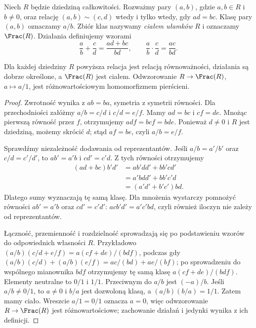 \begin{definicja}
Niech $R$ będzie dziedziną całkowitości.
Rozważmy pary $(a,b)$, gdzie $a,b\in R$ i $b\ne0$,
oraz relację $(a,b)\sim(c,d)$ wtedy i tylko wtedy,
gdy $ad=bc$. Klasę pary $(a,b)$ oznaczamy $a/b$.
Zbiór klas nazywamy \emph{ciałem ułamków} $R$
i oznaczamy $\Frac(R)$. Działania definiujemy wzorami
\[
\frac ab+\frac cd=\frac{ad+bc}{bd},\qquad
\frac ab\cdot\frac cd=\frac{ac}{bd}.
\]
\end{definicja}

\begin{lemat}
\label{lem:frac-construction}
Dla każdej dziedziny $R$ powyższa relacja jest relacją
równoważności, działania są dobrze określone, a $\Frac(R)$
jest ciałem. Odwzorowanie $R\to\Frac(R)$,
$a\mapsto a/1$, jest różnowartościowym homomorfizmem pierścieni.
\end{lemat}
\begin{proof}
Zwrotność wynika z $ab=ba$, symetria z symetrii równości.
Dla przechodniości załóżmy $a/b=c/d$ i $c/d=e/f$.
Mamy $ad=bc$ i $cf=de$. Mnożąc pierwszą równość przez
$f$, otrzymujemy $adf=bcf=bde$. Ponieważ $d\ne0$
i $R$ jest dziedziną, możemy skrócić $d$; stąd $af=be$,
czyli $a/b=e/f$.

Sprawdźmy niezależność dodawania od reprezentantów.
Jeśli $a/b=a'/b'$ oraz $c/d=c'/d'$, to
$ab'=a'b$ i $cd'=c'd$. Z tych równości otrzymujemy
\begin{align*}
(ad+bc)b'd'
 &=ab'dd'+bb'cd'\\
 &=a'bdd'+bb'c'd\\
 &=(a'd'+b'c')bd.
\end{align*}
Dlatego sumy wyznaczają tę samą klasę. Dla mnożenia
wystarczy pomnożyć równości $ab'=a'b$ oraz $cd'=c'd'$:
$acb'd'=a'c'bd$, czyli również iloczyn nie zależy od
reprezentantów.

Łączność, przemienność i rozdzielność sprowadzają się
po podstawieniu wzorów do odpowiednich własności $R$.
Przykładowo $(a/b)(c/d+e/f)=a(cf+de)/(bdf)$,
podczas gdy $(a/b)(c/d)+(a/b)(e/f)=ac/(bd)+ae/(bf)$;
po sprowadzeniu do wspólnego mianownika $bdf$ otrzymujemy
tę samą klasę $a(cf+de)/(bdf)$.
Elementy neutralne to $0/1$ i $1/1$.
Przeciwnym do $a/b$ jest $(-a)/b$.
Jeśli $a/b\ne0/1$, to $a\ne0$ i $b/a$ jest dozwoloną klasą,
a $(a/b)(b/a)=1/1$. Zatem mamy ciało.
Wreszcie $a/1=0/1$ oznacza $a=0$, więc odwzorowanie
$R\to\Frac(R)$ jest różnowartościowe; zachowanie działań
i jedynki wynika z ich definicji.
\end{proof}

